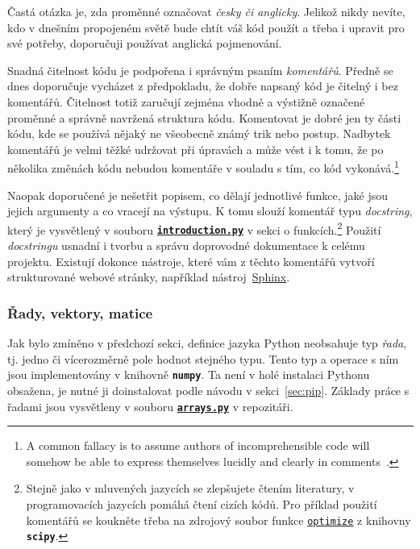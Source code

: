 \documentclass[a4paper,11pt,twoside]{article}
\def\code#1{\textnormal{\texttt{#1}}}
\def\file#1{\textnormal{\textbf{\texttt{#1}}}}
\def\ghfile#1#2{\textnormal{\textbf{\texttt{\href{https://github.com/PavelStransky/PCInPhysics/blob/main/#1#2}{#2}}}}}
\theoremstyle{red}
\theoremstyle{green}
\begin{document}
    Častá otázka je, zda proměnné označovat \emph{česky či anglicky}.
    Jelikož nikdy nevíte, kdo v dnešním propojeném světě bude chtít váš kód použít a třeba i upravit pro své potřeby, doporučuji používat anglická pojmenování.
    
    Snadná čitelnost kódu je podpořena i správným psaním \emph{komentářů}.
    Předně se dnes doporučuje vycházet z předpokladu, že dobře napsaný kód je čitelný i bez komentářů.
    Čitelnost totiž zaručují zejména vhodně a výstižně označené proměnné a správně navržená struktura kódu.
    Komentovat je dobré jen ty části kódu, kde se používá nějaký ne všeobecně známý trik nebo postup.
    Nadbytek komentářů je velmi těžké udržovat při úpravách a může vést i k tomu, že po několika změnách kódu nebudou komentáře v souladu s tím, co kód vykonává.\footnote{
        A common fallacy is to assume authors of incomprehensible code will somehow be able to express themselves lucidly and clearly in comments~\cite{Henney}.
    }
    
    Naopak doporučené je nešetřit popisem, co dělají jednotlivé funkce, jaké jsou jejich argumenty a co vracejí na výstupu.
    K tomu slouží komentář typu \emph{docstring}, který je vysvětlený v souboru \ghfile{python/basics/}{introduction.py} v sekci o funkcích.\footnote{
        Stejně jako v mluvených jazycích se zlepšujete čtením literatury, v programovacích jazycích pomáhá čtení cizích kódů.
        Pro příklad použití komentářů se koukněte třeba na zdrojový soubor funkce \code{\href{https://github.com/scipy/scipy/blob/master/scipy/optimize/optimize.py}{optimize}} z knihovny \file{scipy}.
    }
    Použití \emph{docstringu} usnadní i tvorbu a správu doprovodné dokumentace k celému projektu.
    Existují dokonce nástroje, které vám z těchto komentářů vytvoří strukturované webové stránky, například nástroj~\href{https://www.sphinx-doc.org}{Sphinx}.

\subsubsection{Řady, vektory, matice}
\label{sec:numpy}
    Jak bylo zmíněno v předchozí sekci, definice jazyka Python neobsahuje typ \emph{řada}, tj. jedno či vícerozměrně pole hodnot stejného typu.
    Tento typ a operace s ním jsou implementovány v knihovně \file{numpy}.
    Ta není v holé instalaci Pythonu obsažena, je nutné ji doinstalovat podle návodu v sekci~\ref{sec:pip}.
    Základy práce s řadami jsou vysvětleny v souboru \ghfile{python/basics/}{arrays.py} v repozitáři.
\end{document}
